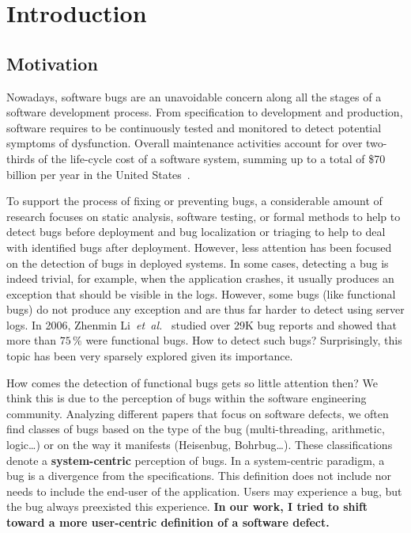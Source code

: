 \chapter{Introduction}
\label{ch:intro:introduction}

\section{Motivation}
Nowadays, software bugs are an unavoidable concern along all the stages of a software development process.
From specification to development and production, software requires to be continuously tested and monitored to detect potential symptoms of dysfunction.
Overall maintenance activities account for over two-thirds of the life-cycle cost of a software system, summing up to a total of \$70 billion per year in the United States~\cite{planning2002economic}.

To support the process of fixing or preventing bugs, a considerable amount of research focuses on static analysis, software testing, or formal methods to help to detect bugs before deployment and bug localization or triaging to help to deal with identified bugs after deployment.
However, less attention has been focused on the detection of bugs in deployed systems. 
In some cases, detecting a bug is indeed trivial, for example, when the application crashes, it usually produces an exception that should be visible in the logs.
However, some bugs (like functional bugs) do not produce any exception and are thus far harder to detect using server logs.
In 2006, Zhenmin Li~\textit{et~al.}~\cite{li2006have} studied over 29K bug reports and showed that more than $75\,\%$ were functional bugs.
How to detect such bugs?
Surprisingly, this topic has been very sparsely explored given its importance.

How comes the detection of functional bugs gets so little attention then?
We think this is due to the perception of bugs within the software engineering community.
Analyzing different papers that focus on software defects, we often find classes of bugs based on the type of the bug (multi-threading, arithmetic, logic\dots) or on the way it manifests (Heisenbug, Bohrbug\dots).
These classifications denote a \textbf{system-centric} perception of bugs.
In a system-centric paradigm, a bug is a divergence from the specifications.
This definition does not include nor needs to include the end-user of the application.
Users may experience a bug, but the bug always preexisted this experience. 
\textbf{In our work, I tried to shift toward a more user-centric definition of a software defect.}

